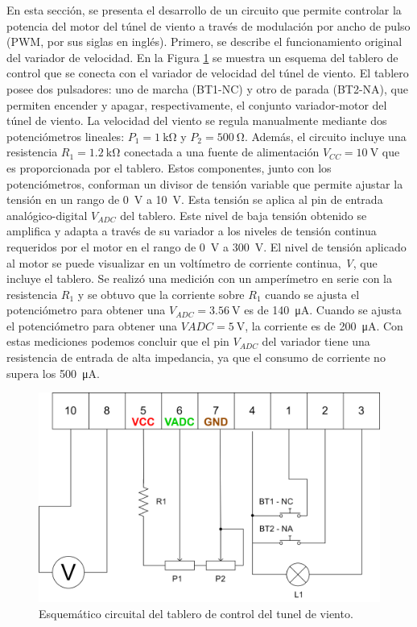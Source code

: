 En esta sección, se presenta el desarrollo de un circuito que permite controlar la potencia del motor del túnel de viento a través de modulación por ancho de pulso (PWM, por sus siglas en inglés). Primero, se describe el funcionamiento original del variador de velocidad. En la Figura \ref{fig:esquemCircuitoControlTunel} se muestra un esquema del tablero de control que se conecta con el variador de velocidad del túnel de viento. El tablero posee dos pulsadores: uno de marcha (BT1-NC) y otro de parada (BT2-NA), que permiten encender y apagar, respectivamente, el conjunto variador-motor del túnel de viento. La velocidad del viento se regula manualmente mediante dos potenciómetros lineales: $P_{1} = \SI{1}{\kilo\ohm}$ y $P_{2} = \SI{500}{\ohm}$. Además, el circuito incluye una resistencia $R_{1} = \SI{1.2}{\kilo\ohm}$ conectada a una fuente de alimentación $V_{CC} = \SI{10}{\volt}$ que es proporcionada por el tablero. Estos componentes, junto con los potenciómetros, conforman un divisor de tensión variable que permite ajustar la tensión en un rango de \SI{0}{\volt} a \SI{10}{\volt}. Esta tensión se aplica al pin de entrada analógico-digital $V_{ADC}$ del tablero. Este nivel de baja tensión obtenido se amplifica y adapta a través de su variador a los niveles de tensión continua requeridos por el motor en el rango de \SI{0}{\volt} a \SI{300}{\volt}. El nivel de tensión aplicado al motor se puede visualizar en un voltímetro de corriente continua, \textit{V}, que incluye el tablero. Se realizó una medición con un amperímetro en serie con la resistencia $R_{1}$ y se obtuvo que la corriente sobre $R_{1}$ cuando se ajusta el potenciómetro para obtener una $V_{ADC} = \SI{3.56}{\volt}$ es de \SI{140}{\micro\ampere}. Cuando se ajusta el potenciómetro para obtener una $VADC = \SI{5}{\volt}$, la corriente es de \SI{200}{\micro\ampere}. Con estas mediciones podemos concluir que el pin $V_{ADC}$ del variador tiene una resistencia de entrada de alta impedancia, ya que el consumo de corriente no supera los \SI{500}{\micro\ampere}.


\begin{figure}[H]
    \centering
    \includegraphics[width=0.85\linewidth]{Figuras/datalogger/Hardware/esquemCircuitoControlTunel.png}
    \caption{Esquemático circuital del tablero de control del tunel de viento.}
    \label{fig:esquemCircuitoControlTunel}
\end{figure}

